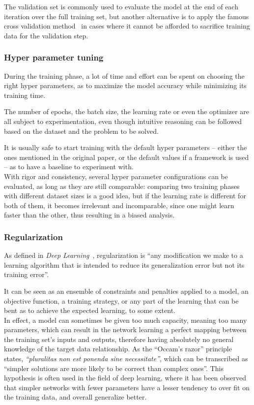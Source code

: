 The validation set is commonly used to evaluate the model at the end of each
iteration over the full training set, but another alternative is to apply the
famous cross validation method~\cite{CrossVal} in cases where it cannot be
afforded to sacrifice training data for the validation step.

	\subsubsection{Hyper parameter tuning}

During the training phase, a lot of time and effort can be spent on choosing
the right hyper parameters, as to maximize the model accuracy while minimizing
its training time.

The number of epochs, the batch size, the learning rate or even the optimizer
are all subject to experimentation, even though intuitive reasoning can be
followed based on the dataset and the problem to be solved.

It is usually safe to start training with the default hyper parameters -- either
the ones mentioned in the original paper, or the default values if a framework
is used -- as to have a baseline to experiment with.\\

With rigor and consistency, several hyper parameter configurations can be
evaluated, as long as they are still comparable: comparing two training phases
with different dataset sizes is a good idea, but if the learning rate is
different for both of them, it becomes irrelevant and incomparable, since one
might learn faster than the other, thus resulting in a biased analysis.

	\subsubsection{Regularization}

As defined in \emph{Deep Learning}~\cite{Goodfellow-et-al-2016}, regularization
is ``any modification we make to a learning algorithm that is intended to
reduce its generalization error but not its training error''.

It can be seen as an ensemble of constraints and penalties applied to a model,
an objective function, a training strategy, or any part of the learning that
can be bent as to achieve the expected learning, to some extent.\\

In effect, a model can sometimes be given too much capacity, meaning too many
parameters, which can result in the network learning a perfect mapping between
the training set's inputs and outputs, therefore having absolutely no general
knowledge of the target data relationship. As the ``Occam's razor'' principle
states, \emph{``pluralitas non est ponenda sine necessitate''}, which can be
transcribed as ``simpler solutions are more likely to be correct than complex
ones''. This hypothesis is often used in the field of deep learning, where it
has been observed that simpler networks with fewer parameters have a lesser
tendency to over fit on the training data, and overall generalize better.\\


